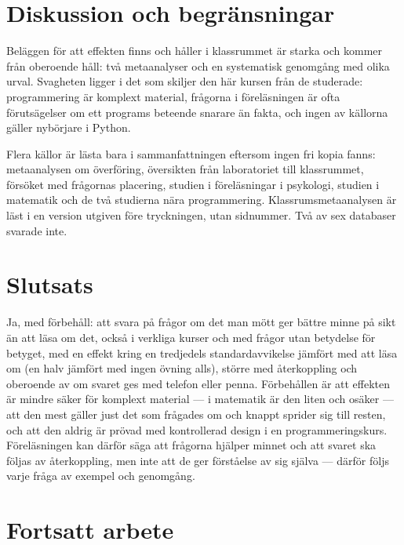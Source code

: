 \section{Diskussion och begränsningar}
\label{sec:recap-retrieval-diskussion}

Beläggen för att effekten finns och håller i klassrummet är starka och
kommer från oberoende håll: två metaanalyser och en systematisk
genomgång med olika urval.  Svagheten ligger i det som skiljer den här
kursen från de studerade: programmering är komplext material, frågorna
i föreläsningen är ofta förutsägelser om ett programs beteende snarare
än fakta, och ingen av källorna gäller nybörjare i Python.

Flera källor är lästa bara i sammanfattningen eftersom ingen fri kopia
fanns: metaanalysen om överföring\autocite{PanRickard2018Transfer},
översikten från laboratoriet till klassrummet\autocite{Trumbo2021Testing},
försöket med frågornas placering\autocite{McDaniel2011Quiz}, studien i
föreläsningar i psykologi\autocite{Glaser2025LectureHall}, studien i
matematik\autocite{Schwerter2026Gateway} och de två studierna nära
programmering\autocite{Alzaid2017BiteSize,Wojtowicz2025SQL}.
Klassrumsmetaanalysen
är läst i en version utgiven före tryckningen, utan sidnummer.  Två av
sex databaser svarade inte.

\section{Slutsats}
\label{sec:recap-retrieval-slutsats}

Ja, med förbehåll: att svara på frågor om det man mött ger bättre minne
på sikt än att läsa om det, också i verkliga kurser och med frågor utan
betydelse för betyget, med en effekt kring en tredjedels
standardavvikelse jämfört med att läsa om (en halv jämfört med ingen
övning alls),
större med återkoppling och oberoende av om svaret ges med telefon eller
penna.  Förbehållen är att effekten är mindre säker för komplext
material --- i matematik är den liten och osäker --- att den mest gäller
just det som frågades om och knappt sprider sig till resten, och att den
aldrig är prövad med kontrollerad design i en programmeringskurs.
Föreläsningen
kan därför säga att frågorna hjälper minnet och att svaret ska följas av
återkoppling, men inte att de ger förståelse av sig själva --- därför
följs varje fråga av exempel och genomgång.

\section{Fortsatt arbete}
\label{sec:recap-retrieval-fortsatt}

